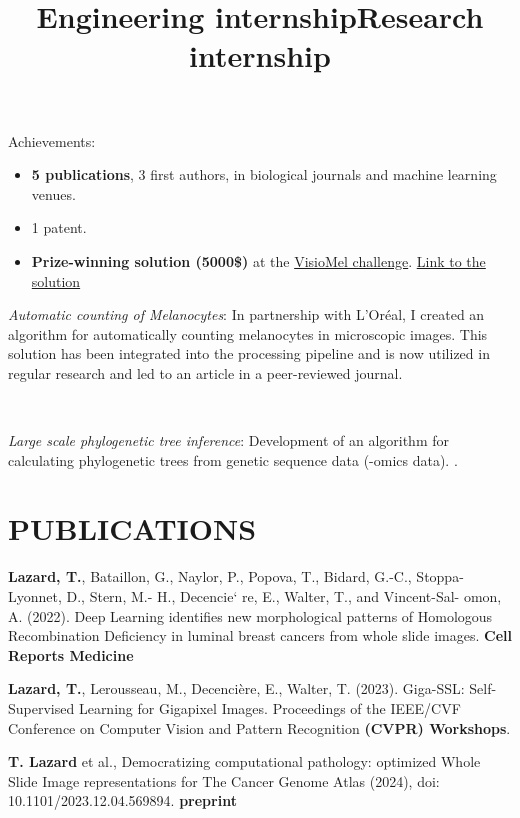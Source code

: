 \documentclass[margin]{res}
\begin{document}
\begin{resume}
\begin{position}
Achievements:

\begin{itemize}
    \item \textbf{5 publications}, 3 first authors, in biological journals and machine learning venues. 
    \item 1 patent.
    \item \textbf{Prize-winning solution (5000\$)} at the \href{https://www.drivendata.org/competitions/148/visiomel-melanoma/leaderboard/}{VisioMel challenge}. 
        \href{https://github.com/drivendataorg/visiomel-melanoma/tree/main/3rd%20Place}{Link to the solution}
\end{itemize}

\end{position}

\title{\textbf{Engineering internship}}
\begin{position}
{\sl Automatic counting of Melanocytes}: In partnership with L'Oréal,
I created an algorithm for automatically counting melanocytes in microscopic images. This solution has been integrated into the processing pipeline and is now utilized in regular research and led to an article in a peer-reviewed journal.
\end{position}
\\
\title{\textbf{Research internship}}
\begin{position}
{\sl Large scale phylogenetic tree inference}: Development of an algorithm for calculating phylogenetic trees from genetic sequence data (-omics data).
.
\end{position}


\section{PUBLICATIONS}
\textbf{Lazard, T.}, Bataillon, G., Naylor, P., Popova, T.,
Bidard, G.-C., Stoppa-Lyonnet, D., Stern, M.-
H., Decencie` re, E., Walter, T., and Vincent-Sal-
omon, A. (2022). Deep Learning identifies new
morphological patterns of Homologous
Recombination Deficiency in luminal breast
cancers from whole slide images. \textbf{Cell Reports
Medicine} 
\par
\textbf{Lazard, T.}, Lerousseau, M., Decenci\`ere, E., Walter, T. (2023).
Giga-SSL: Self-Supervised Learning for Gigapixel Images.
Proceedings of the IEEE/CVF Conference on Computer Vision and Pattern Recognition \textbf{(CVPR) Workshops}.
\par
\textbf{T. Lazard} et al., 
Democratizing computational pathology: optimized Whole Slide Image representations for The Cancer Genome Atlas (2024), doi: 10.1101/2023.12.04.569894. 
\textbf{preprint}


\end{resume}
\end{document}
